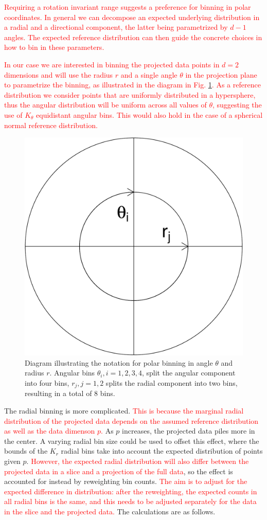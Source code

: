 \documentclass[]{interact}
\theoremstyle{plain}%
\theoremstyle{definition}
\theoremstyle{remark}
\begin{document}
\textcolor{red}{Requiring a rotation invariant range suggests a preference for binning in polar coordinates. In general we can decompose an expected underlying distribution in a radial and a directional component, the latter being parametrized by $d-1$ angles. The expected reference distribution can then guide the concrete choices in how to bin in these parameters.}

\textcolor{red}{In our case we are interested in binning the projected data points in $d=2$ dimensions and will use the radius $r$ and a single angle $\theta$ in the projection plane to parametrize the binning, as illustrated in the diagram in Fig. \ref{fig:sketch}. As a reference distribution we consider points that are uniformly distributed in a hypersphere, thus the angular distribution will be uniform across all values of $\theta$, suggesting the use of $K_{\theta}$ equidistant angular bins. This would also hold in the case of a spherical normal reference distribution.}

\begin{figure}

{\centering \includegraphics[width=0.3\linewidth]{section_pursuit_files/figure-latex/sketch-1} 

}

\caption{Diagram illustrating the notation for polar binning in angle $\theta$ and radius $r$. Angular bins $\theta_i, i=1, 2, 3, 4$, split the angular component into four bins, $r_j, j=1, 2$ splits the radial component into two bins, resulting in a total of 8 bins.}\label{fig:sketch}
\end{figure}

The radial binning is more complicated.
\textcolor{red}{This is because the marginal radial distribution of the projected data depends on the assumed reference distribution as well as the data dimenson $p$.}
As \(p\) increases, the projected data piles more in the center. A
varying radial bin size could be used to offset this effect, where the
bounds of the \(K_r\) radial bins take into account the expected
distribution of points given \(p\).
\textcolor{red}{However, the expected radial distribution will also differ between the projected data in a slice and a projection of the full data},
so the effect is accounted for instead by reweighting bin counts.
\textcolor{red}{The aim is to adjust for the expected difference in distribution: after the reweighting, the expected counts in all radial bins is the same, and this needs to be adjusted separately for the data in the slice and the projected data.}
The calculations are as follows.
\end{document}
